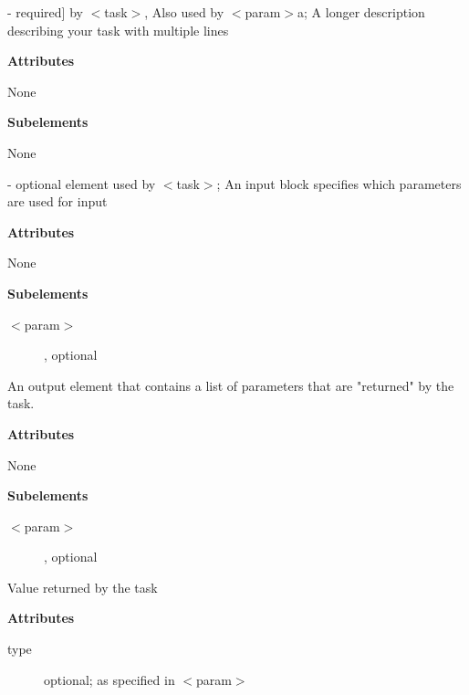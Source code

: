 \begin{description}
\item [$<$description$>$] - required] by $<$task$>$, Also used by $<$param$>$a; A longer description describing your task with multiple lines
\begin{description}
\item \textbf{Attributes}
\begin{description}
\item None
\end{description}
\item \textbf{Subelements}
\begin{description}
\item None
\end{description}
\end{description}
\item[$<$input$>$] - optional element used by $<$task$>$;
 An input block specifies which parameters are used for input
\begin{description}
\item \textbf{Attributes}
\begin{description}
\item None
\end{description}
\item \textbf{Subelements}
\begin{description}
\item [$<$param$>$], optional
\end{description}
\end{description}
\item[$<$output$>$ - optional]
An output element that contains a list of parameters that are "returned" by the task.
\begin{description}
\item \textbf{Attributes}
\begin{description}
\item None
\end{description}
\item \textbf{Subelements}
\begin{description}
\item [$<$param$>$], optional
\end{description}
\end{description}
\item [$<$returns$>$ - optional]
Value returned by the task
\begin{description}
\item \textbf{Attributes}
\begin{description}
\item [type] optional; as specified in $<$param$>$

\end{description}
\end{description}
\end{description}

